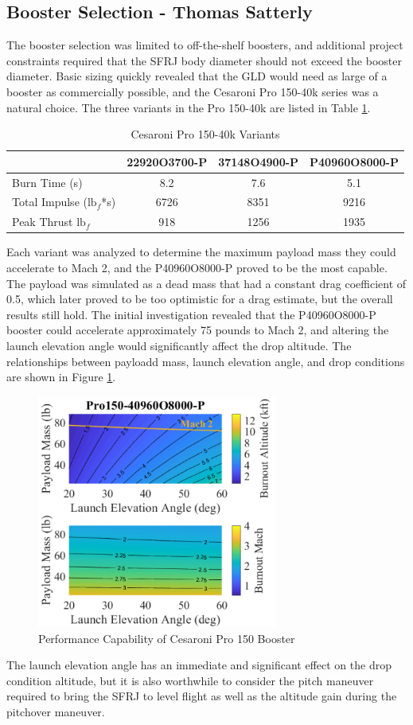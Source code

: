 \subsection{Booster Selection - Thomas Satterly}

The booster selection was limited to off-the-shelf boosters, and additional project constraints required that the SFRJ body diameter should not exceed the booster diameter. Basic sizing quickly revealed that the GLD would need as large of a booster as commercially possible, and the Cesaroni Pro 150-40k series was a natural choice. The three variants in the Pro 150-40k are listed in Table \ref{tab:pro150Variants}. 

\begin{table}[H]
    \centering
    \caption{Cesaroni Pro 150-40k Variants}
    \label{tab:pro150Variants}
    \begin{tabular}{l|c|c|c}
          & \textbf{22920O3700-P} & \textbf{37148O4900-P} & \textbf{P40960O8000-P} \\
          \hline
        Burn Time (s) & 8.2 & 7.6 & 5.1 \\
        Total Impulse ($\text{lb}_{f}$*s) & 6726 & 8351 & 9216 \\
        Peak Thrust $\text{lb}_{f}$ & 918 & 1256 & 1935
    \end{tabular}
\end{table}

Each variant was analyzed to determine the maximum payload mass they could accelerate to Mach 2, and the P40960O8000-P proved to be the most capable. The payload was simulated as a dead mass that had a constant drag coefficient of 0.5, which later proved to be too optimistic for a drag estimate, but the overall results still hold. The initial investigation revealed that the P40960O8000-P booster could accelerate approximately 75 pounds to Mach 2, and altering the launch elevation angle would significantly affect the drop altitude. The relationships between payloadd mass, launch elevation angle, and drop conditions are shown in Figure \ref{fig:boostPerformance}.

\begin{figure}[H]
    \centering
    \includegraphics[width=0.7\textwidth]{ParameterSweeps/figures/BoostFig.png}
    \caption{Performance Capability of Cesaroni Pro 150 Booster}
    \label{fig:boostPerformance}
\end{figure}

The launch elevation angle has an immediate and significant effect on the drop condition altitude, but it is also worthwhile to consider the pitch maneuver required to bring the SFRJ to level flight as well as the altitude gain during the pitchover maneuver. 
